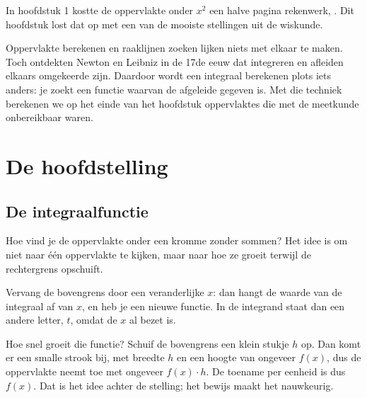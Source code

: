 In hoofdstuk 1 kostte de oppervlakte onder $x^2$ een halve pagina rekenwerk, . Dit hoofdstuk lost dat op met een van de mooiste stellingen uit de wiskunde.

Oppervlakte berekenen en raaklijnen zoeken lijken niets met elkaar te maken. Toch ontdekten Newton en Leibniz in de 17de eeuw dat integreren en afleiden elkaars omgekeerde zijn. Daardoor wordt een integraal berekenen plots iets anders: je zoekt een functie waarvan de afgeleide gegeven is. Met die techniek berekenen we op het einde van het hoofdstuk oppervlaktes die met de meetkunde onbereikbaar waren.

\begin{oefeningen}[Start]

\end{oefeningen}


\section{De hoofdstelling}

\subsection{De integraalfunctie}

Hoe vind je de oppervlakte onder een kromme zonder sommen? Het idee is om niet naar één oppervlakte te kijken, maar naar hoe ze groeit terwijl de rechtergrens opschuift.

Vervang de bovengrens door een veranderlijke $x$: dan hangt de waarde van de integraal af van $x$, en heb je een nieuwe functie. In de integrand staat dan een andere letter, $t$, omdat de $x$ al bezet is.

Hoe snel groeit die functie? Schuif de bovengrens een klein stukje $h$ op. Dan komt er een smalle strook bij, met breedte $h$ en een hoogte van ongeveer $f(x)$, dus de oppervlakte neemt toe met ongeveer $f(x) \cdot h$. De toename per eenheid is dus $f(x)$. Dat is het idee achter de stelling; het bewijs maakt het nauwkeurig.


